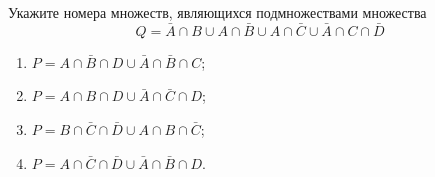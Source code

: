 \question
Укажите номера множеств, являющихся подмножествами множества
\begin{equation*}
	Q = \bar{A} \cap B \cup A \cap \bar{B} \cup A \cap \bar{C} \cup \bar{A} \cap C \cap \bar{D}
\end{equation*}

\begin{enumerate}
	\renewcommand{\labelenumi}{\arabic{enumi})}
	\item $P = A \cap \bar{B} \cap D \cup \bar{A} \cap \bar{B} \cap C$;
	\item $P = A \cap B \cap D \cup \bar{A} \cap \bar{C} \cap D$;
	\item $P = B \cap \bar{C} \cap \bar{D} \cup A \cap B \cap \bar{C}$;
	\item $P = A \cap \bar{C} \cap \bar{D} \cup \bar{A} \cap \bar{B} \cap D$.
\end{enumerate}
